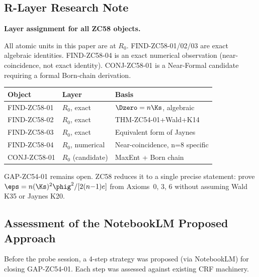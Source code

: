 \documentclass[12pt, a4paper]{article}
\begin{document}
\subsection{R-Layer Research Note}

\begin{layerbox}
\textbf{Layer assignment for all ZC58 objects.}

All atomic units in this paper are at $R_0$.
FIND-ZC58-01/02/03 are exact algebraic identities.
FIND-ZC58-04 is an exact numerical observation
(near-coincidence, not exact identity).
CONJ-ZC58-01 is a Near-Formal candidate requiring a formal
Born-chain derivation.

\begin{center}
\begin{tabular}{@{}lll@{}}
\toprule
\textbf{Object} & \textbf{Layer} & \textbf{Basis} \\
\midrule
FIND-ZC58-01 & $R_0$, exact & $\Dzero=n\Ks$, algebraic \\
FIND-ZC58-02 & $R_0$, exact & THM-ZC54-01+Wald+K14 \\
FIND-ZC58-03 & $R_0$, exact & Equivalent form of Jaynes \\
FIND-ZC58-04 & $R_0$, numerical & Near-coincidence, n=8 specific \\
CONJ-ZC58-01 & $R_0$ (candidate) & MaxEnt + Born chain \\
\bottomrule
\end{tabular}
\end{center}

GAP-ZC54-01 remains open.
ZC58 reduces it to a single precise statement: prove
$\eps=n({\Ks})^2\phig^2/[2(n{-}1)e]$ from Axioms~0, 3, 6
without assuming Wald K35 or Jaynes K20.
\end{layerbox}

\subsection{Assessment of the NotebookLM Proposed Approach}

Before the probe session, a 4-step strategy was proposed
(via NotebookLM) for closing GAP-ZC54-01.
Each step was assessed against existing CRF machinery.
\end{document}
